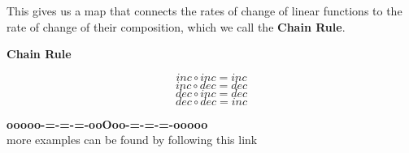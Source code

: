 \documentclass{ximera}
\begin{document}
This gives us a map that connects the rates of change of linear functions to the rate of change of their composition, which we call the \textbf{Chain Rule}.


\begin{idea} \textbf{\textcolor{blue!55!black}{Chain Rule}}


\[ inc \circ inc = inc \]
\[ inc \circ dec = dec \]
\[ dec \circ inc = dec \]
\[ dec \circ dec = inc \]


\end{idea}








\begin{center}
\textbf{\textcolor{green!50!black}{ooooo-=-=-=-ooOoo-=-=-=-ooooo}} \\

more examples can be found by following this link\\ 

\end{center}
\end{document}
